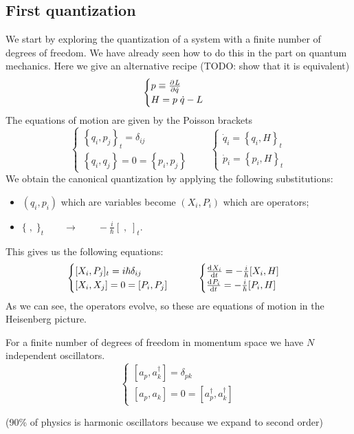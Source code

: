 \subsection{First quantization}
We start by exploring the quantization of a system with a finite number of degrees of freedom. We have already seen how to do this in the part on quantum mechanics. Here we give an alternative recipe (TODO: show that it is equivalent)
\[ \begin{cases}
p \equiv  \frac{\partial{^{}}L}{\partial{{\dot{q}}^{}}}  \\
H = p \; \dot{q} - L
\end{cases} \]
The equations of motion are given by the Poisson brackets
\[ \begin{cases}
\left\{q_i,p_j\right\}_t = \delta_{ij} \\ \left\{q_i,q_j\right\} = 0 = \left\{p_i,p_j\right\}
\end{cases} \qquad \begin{cases}
\dot{q}_i = \left\{q_i,H\right\}_t \\ \dot{p}_i = \left\{p_i, H\right\}_t
\end{cases}\]
We obtain the canonical quantization by applying the following substitutions:
\begin{itemize}
\item $(q_i, p_i)$ which are variables become $(X_i,P_i)$ which are operators;
\item $\{\;,\;\}_t \qquad \to \qquad - \frac{i}{\hbar}[\;,\;]_t$.
\end{itemize}
This gives us the following equations:
\[ \begin{cases}
[X_i,P_j]_t = i\hbar\delta_{ij} \\ [X_i,X_j] = 0 = [P_i,P_j]
\end{cases} \qquad \begin{cases}
\od{X_i}{t}  = - \frac{i}{\hbar}[X_i,H] \\ \od{P_i}{t} = - \frac{i}{\hbar}[P_i, H]
\end{cases} \]
As we can see, the operators evolve, so these are equations of motion in the Heisenberg picture.


For a finite number of degrees of freedom in momentum space we have $N$ independent oscillators.
\[ \begin{cases}
[a_p,a^\dagger_k] = \delta_{pk} \\
[a_p,a_k] = 0 = [a^\dagger_p, a^\dagger_k]
\end{cases} \]

(90\% of physics is harmonic oscillators because we expand to second order)



